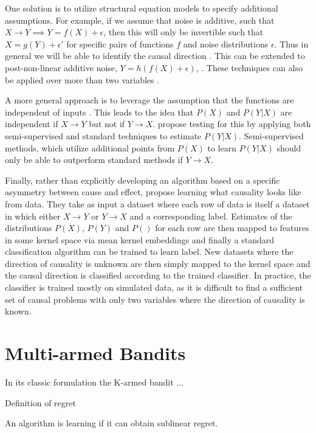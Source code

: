 \documentclass[11pt,a4paper]{article}
\begin{document}
One solution is to utilize structural equation models to specify additional assumptions. For example, if we assume that noise is additive, such that $X \rightarrow Y \implies Y = f(X)+\epsilon$, then this will only be invertible such that $X = g(Y) + \epsilon'$ for specific pairs of functions $f$ and noise distributions $\epsilon$. Thus in general we will be able to identify the causal direction \cite{Hoyer2009}. This can be extended to post-non-linear additive noise, $Y = h(f(X)+ \epsilon)$, \cite{Zhang2008a}. These techniques can also be applied over more than two variables \cite{}.

A more general approach is to leverage the assumption that the functions are independent of inputs \cite{}. This leads to the idea that $P(X)$ and $P(Y|X)$ are independent if $X \rightarrow Y$ but not if $Y \rightarrow X$. \cite{} propose testing for this by applying both semi-supervised and standard techniques to estimate $P(Y|X)$. Semi-supervised methods, which utilize additional points from $P(X)$ to learn $P(Y|X)$ should only be able to outperform standard methods if $Y \rightarrow X$. 

Finally, rather than explicitly developing an algorithm based on a specific asymmetry between cause and effect, \cite{} propose learning what causality looks like from data. They take as input a dataset where each row of data is itself a dataset in which either $X \rightarrow Y$ or $Y \rightarrow X$ and a corresponding label. Estimates of the distributions $P(X)$, $P(Y)$ and $P()$ for each row are then mapped to features in some kernel space via mean kernel embeddings and finally a standard classification algorithm can be trained to learn label. New datasets where the direction of causality is unknown are then simply mapped to the kernel space and the causal direction is classified according to the trained classifier. In practice, the classifier is trained mostly on simulated data, as it is difficult to find a sufficient set of causal problems with only two variables where the direction of causality is known. 

 
\section{Multi-armed Bandits}

In its classic formulation \cite{Robbins1952} the K-armed bandit ...


Definition of regret

An algorithm is learning if it can obtain sublinear regret.
\end{document}
